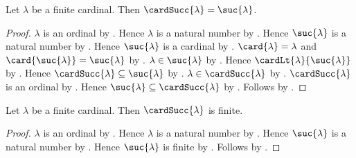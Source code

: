 \begin{proposition}\label{finite_cardinal_successor}
    Let $\lambda$ be a finite cardinal.
    Then $\cardSucc{\lambda}=\suc{\lambda}$.
\end{proposition}
\begin{proof}
    $\lambda$ is an ordinal by .
    Hence $\lambda$ is a natural number
        by .
    Hence $\suc{\lambda}$ is a natural number
        by .
    Hence $\suc{\lambda}$ is a cardinal
        by .
    $\card{\lambda}=\lambda$ and
        $\card{\suc{\lambda}}=\suc{\lambda}$
        by .
    $\lambda\in\suc{\lambda}$ by .
    Hence $\cardLt{\lambda}{\suc{\lambda}}$
        by .
    Hence $\cardSucc{\lambda}\subseteq\suc{\lambda}$
        by .
    $\lambda\in\cardSucc{\lambda}$
        by .
    $\cardSucc{\lambda}$ is an ordinal
        by .
    Hence $\suc{\lambda}\subseteq\cardSucc{\lambda}$
        by .
    Follows by .
\end{proof}

\begin{corollary}\label{finite_cardinal_has_finite_successor}
    Let $\lambda$ be a finite cardinal.
    Then $\cardSucc{\lambda}$ is finite.
\end{corollary}
\begin{proof}
    $\lambda$ is an ordinal by .
    Hence $\lambda$ is a natural number
        by .
    Hence $\suc{\lambda}$ is a natural number
        by .
    Hence $\suc{\lambda}$ is finite
        by .
    Follows by .
\end{proof}

